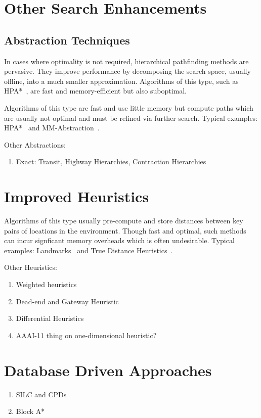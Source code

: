 \section{Other Search Enhancements}
\label{cha::lit::enhancements}

\subsection{Abstraction Techniques}
\label{cha::lit::enhancements::abstraction}
In cases where optimality is not required, hierarchical pathfinding methods
are pervasive.  They improve performance by decomposing the
search space, usually offline, into a much smaller approximation.  Algorithms
of this type, such as HPA*~\cite{botea04}, are  fast and
memory-efficient but also suboptimal.

Algorithms of this type are fast and use little memory but compute paths which are usually not
optimal and must be refined via further search. Typical examples: HPA*~\cite{botea04} and
MM-Abstraction~\cite{sturtevant07}.

Other Abstractions:
\begin{enumerate}
\item{Exact: Transit, Highway Hierarchies, Contraction Hierarchies}
\end{enumerate}

\section{Improved Heuristics}
\label{cha::lit::enhancements::heuristics}
Algorithms of this type usually pre-compute and store distances between key pairs of locations
in the environment. Though fast and optimal, such methods can incur signficant
memory overheads which is often undesirable. Typical examples: Landmarks~\cite{goldberg05} and
True Distance Heuristics~\cite{sturtevant09}.

Other Heuristics:
\begin{enumerate}
\item{Weighted heuristics}
\item{Dead-end and Gateway Heuristic}
\item{Differential Heuristics}
\item{AAAI-11 thing on one-dimensional heuristic?}
\end{enumerate}


\section{Database Driven Approaches}
\label{cha::lit::enhancements::db}

\begin{enumerate}
\item{SILC and CPDs}
\item{Block A*}
\end{enumerate}

